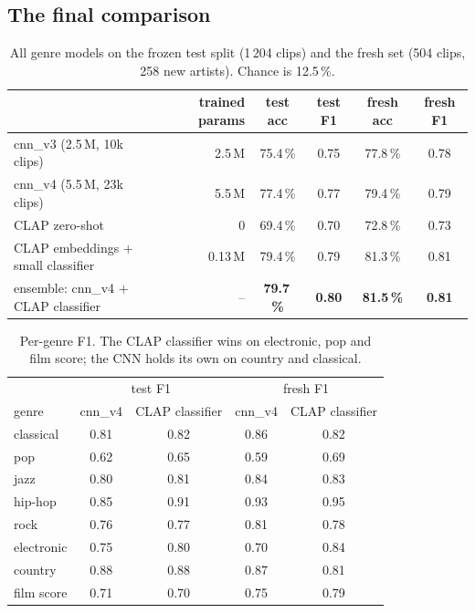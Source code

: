 \documentclass[11pt]{article}
\begin{document}
\subsection{The final comparison}
\begin{table}[h]\centering\small
\begin{tabular}{lrcccc}\toprule
 & trained params & test acc & test F1 & fresh acc & fresh F1 \\\midrule
cnn\_v3 (2.5\,M, 10k clips) & 2.5\,M & 75.4\,\% & 0.75 & 77.8\,\% & 0.78 \\
cnn\_v4 (5.5\,M, 23k clips) & 5.5\,M & 77.4\,\% & 0.77 & 79.4\,\% & 0.79 \\
CLAP zero-shot & 0 & 69.4\,\% & 0.70 & 72.8\,\% & 0.73 \\
CLAP embeddings $+$ small classifier & 0.13\,M & 79.4\,\% & 0.79 & 81.3\,\% & 0.81 \\
ensemble: cnn\_v4 $+$ CLAP classifier & -- & \textbf{79.7\,\%} & \textbf{0.80} & \textbf{81.5\,\%} & \textbf{0.81} \\\bottomrule
\end{tabular}
\caption{All genre models on the frozen test split (1\,204 clips) and the fresh set (504 clips, 258 new artists). Chance is 12.5\,\%.}
\end{table}
\begin{table}[h]\centering\small
\begin{tabular}{lcc|cc}\toprule
 & \multicolumn{2}{c|}{test F1} & \multicolumn{2}{c}{fresh F1} \\
genre & cnn\_v4 & CLAP classifier & cnn\_v4 & CLAP classifier \\\midrule
classical & 0.81 & 0.82 & 0.86 & 0.82 \\
pop & 0.62 & 0.65 & 0.59 & 0.69 \\
jazz & 0.80 & 0.81 & 0.84 & 0.83 \\
hip-hop & 0.85 & 0.91 & 0.93 & 0.95 \\
rock & 0.76 & 0.77 & 0.81 & 0.78 \\
electronic & 0.75 & 0.80 & 0.70 & 0.84 \\
country & 0.88 & 0.88 & 0.87 & 0.81 \\
film score & 0.71 & 0.70 & 0.75 & 0.79 \\\bottomrule
\end{tabular}
\caption{Per-genre F1. The CLAP classifier wins on electronic, pop and film score; the CNN holds its own on country and classical.}
\end{table}
\end{document}
